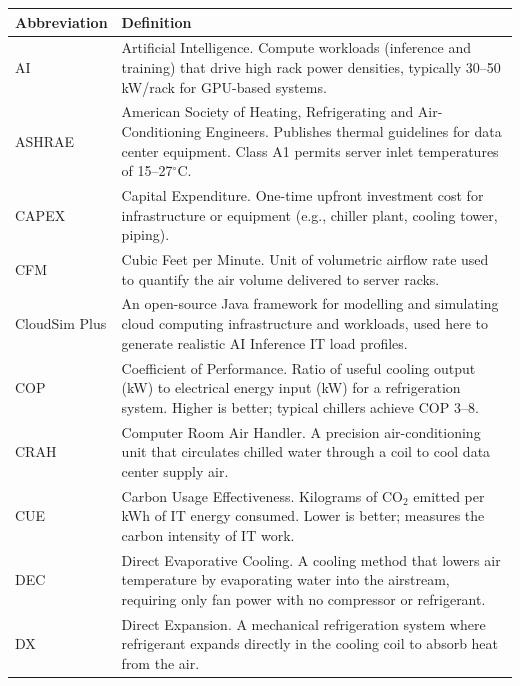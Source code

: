 ﻿\documentclass[12pt,a4paper]{report}
\newcommand{\degC}{$^{\circ}$C}
\begin{document}
\begin{longtable}{p{2.8cm}p{11.5cm}}
\toprule
\textbf{Abbreviation} & \textbf{Definition} \\
\midrule
\endhead
\bottomrule
\endfoot

AI & Artificial Intelligence. Compute workloads (inference and training) that drive
  high rack power densities, typically 30--50 kW/rack for GPU-based systems. \\[4pt]

ASHRAE & American Society of Heating, Refrigerating and Air-Conditioning Engineers.
  Publishes thermal guidelines for data center equipment. Class A1 permits server
  inlet temperatures of 15--27\degC. \\[4pt]

CAPEX & Capital Expenditure. One-time upfront investment cost for infrastructure or
  equipment (e.g., chiller plant, cooling tower, piping). \\[4pt]

CFM & Cubic Feet per Minute. Unit of volumetric airflow rate used to quantify the
  air volume delivered to server racks. \\[4pt]

CloudSim Plus & An open-source Java framework for modelling and simulating cloud
  computing infrastructure and workloads, used here to generate realistic AI
  Inference IT load profiles. \\[4pt]

COP & Coefficient of Performance. Ratio of useful cooling output (kW) to electrical
  energy input (kW) for a refrigeration system. Higher is better; typical chillers
  achieve COP 3--8. \\[4pt]

CRAH & Computer Room Air Handler. A precision air-conditioning unit that circulates
  chilled water through a coil to cool data center supply air. \\[4pt]

CUE & Carbon Usage Effectiveness. Kilograms of CO$_2$ emitted per kWh of IT energy
  consumed. Lower is better; measures the carbon intensity of IT work. \\[4pt]

DEC & Direct Evaporative Cooling. A cooling method that lowers air temperature by
  evaporating water into the airstream, requiring only fan power with no compressor
  or refrigerant. \\[4pt]

DX & Direct Expansion. A mechanical refrigeration system where refrigerant expands
  directly in the cooling coil to absorb heat from the air. \\[4pt]


\end{longtable}
\end{document}
